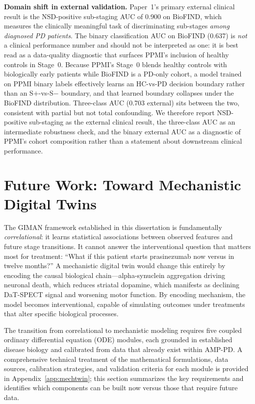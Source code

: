 \textbf{Domain shift in external validation.} Paper~1's primary external clinical result is the NSD-positive sub-staging AUC of 0.900 on BioFIND, which measures the clinically meaningful task of discriminating sub-stages \emph{among diagnosed PD patients}. The binary classification AUC on BioFIND (0.637) is \emph{not} a clinical performance number and should not be interpreted as one: it is best read as a data-quality diagnostic that surfaces PPMI's inclusion of healthy controls in Stage~0. Because PPMI's Stage~0 blends healthy controls with biologically early patients while BioFIND is a PD-only cohort, a model trained on PPMI binary labels effectively learns an HC-vs-PD decision boundary rather than an S$+$-vs-S$-$ boundary, and that learned boundary collapses under the BioFIND distribution. Three-class AUC (0.703 external) sits between the two, consistent with partial but not total confounding. We therefore report NSD-positive sub-staging as the external clinical result, the three-class AUC as an intermediate robustness check, and the binary external AUC as a diagnostic of PPMI's cohort composition rather than a statement about downstream clinical performance.


\section{Future Work: Toward Mechanistic Digital Twins}
\label{sec:future}

The GIMAN framework established in this dissertation is fundamentally \textit{correlational}: it learns statistical associations between observed features and future stage transitions. It cannot answer the interventional question that matters most for treatment: ``What if this patient starts prasinezumab now versus in twelve months?'' A mechanistic digital twin would change this entirely by encoding the causal biological chain---alpha-synuclein aggregation driving neuronal death, which reduces striatal dopamine, which manifests as declining DaT-SPECT signal and worsening motor function. By encoding mechanism, the model becomes interventional, capable of simulating outcomes under treatments that alter specific biological processes.

The transition from correlational to mechanistic modeling requires five coupled ordinary differential equation (ODE) modules, each grounded in established disease biology and calibrated from data that already exist within AMP-PD. A comprehensive technical treatment of the mathematical formulations, data sources, calibration strategies, and validation criteria for each module is provided in Appendix~\ref{app:mechtwin}; this section summarizes the key requirements and identifies which components can be built now versus those that require future data.

